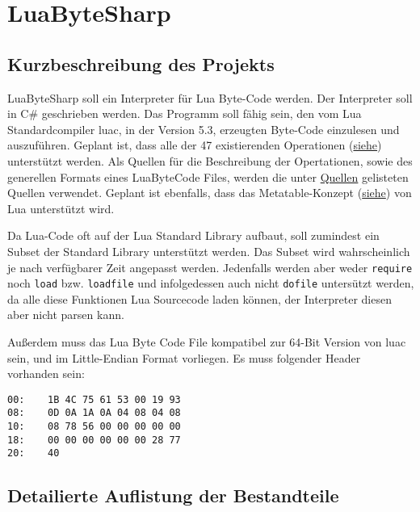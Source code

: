 \documentclass{article}
\begin{document}
\section*{LuaByteSharp}\hypertarget{luabytesharp}{}\label{luabytesharp}

\subsection*{Kurzbeschreibung des Projekts}\hypertarget{kurzbeschreibung-des-projekts}{}\label{kurzbeschreibung-des-projekts}

LuaByteSharp soll ein Interpreter für Lua Byte-Code werden. Der Interpreter soll in C\# geschrieben werden.\newline
Das Programm soll fähig sein, den vom Lua Standardcompiler luac, in der Version 5.3, erzeugten Byte-Code einzulesen und auszuführen.\newline
Geplant ist, dass alle der 47 existierenden Operationen (\href{https://www.lua.org/source/5.3/lopcodes.h.html}{siehe}) unterstützt werden.\newline
Als Quellen für die Beschreibung der Opertationen, sowie des generellen Formats eines LuaByteCode Files, werden die unter \hyperlink{quellen}{Quellen} gelisteten Quellen verwendet.
Geplant ist ebenfalls, dass das Metatable-Konzept (\href{https://www.lua.org/manual/5.3/manual.html\#2.4}{siehe}) von Lua unterstützt wird.

Da Lua-Code oft auf der Lua Standard Library aufbaut, soll zumindest ein Subset der Standard Library unterstützt werden.\newline
Das Subset wird wahrscheinlich je nach verfügbarer Zeit angepasst werden. Jedenfalls werden aber weder \texttt{require} noch \texttt{load} bzw. \texttt{loadfile} und infolgedessen auch nicht \texttt{dofile} untersützt werden, da alle diese Funktionen Lua Sourcecode laden können, der Interpreter diesen aber nicht parsen kann.

Außerdem muss das Lua Byte Code File kompatibel zur 64-Bit Version von luac sein, und im Little-Endian Format vorliegen. Es muss folgender Header vorhanden sein:

\begin{verbatim}00:    1B 4C 75 61 53 00 19 93
08:    0D 0A 1A 0A 04 08 04 08
10:    08 78 56 00 00 00 00 00
18:    00 00 00 00 00 00 28 77
20:    40
\end{verbatim}

\subsection*{Detailierte Auflistung der Bestandteile}\hypertarget{detailierte-auflistung-der-bestandteile}{}\label{detailierte-auflistung-der-bestandteile}
\end{document}
